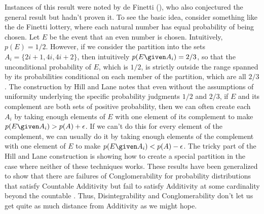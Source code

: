 Instances of this result were noted by de Finetti (\citeyear[pp.\ 177--8]{definetti}), who also conjectured the general result but hadn't proven it. To see the basic idea, consider something like the de Finetti lottery, where each natural number has equal probability of being chosen. Let $E$ be the event that an even number is chosen. Intuitively, $p(E)=1/2$. However, if we consider the partition into the sets $A_i=\{2i+1, 4i, 4i+2\}$, then intuitively ${p(E \given A_i)}=2/3$, so that the unconditional probability of $E$, which is $1/2$, is strictly outside the range spanned by its probabilities conditional on each member of the partition, which are all $2/3$. The construction by Hill and Lane notes that even without the assumptions of uniformity underlying the specific probability judgments $1/2$ and $2/3$, if $E$ and its complement are both sets of positive probability, then we can often create each $A_i$ by taking enough elements of $E$ with one element of its complement to make ${p(E \given A_i)}>p(A)+\epsilon$. If we can't do this for every element of the complement, we can usually do it by taking enough elements of the complement with one element of $E$ to make $p(E \given A_i)<p(A)-\epsilon$. The tricky part of the Hill and Lane construction is showing how to create a special partition in the case where neither of these techniques works. These results have been generalized to show that there are failures of Conglomerability for probability distributions that satisfy Countable Additivity but fail to satisfy Additivity at some cardinality beyond the countable \citep{sskkappa, nonkappa}. %
Thus, Disintegrability and Conglomerability don't let us get quite as much distance from Additivity as we might hope.


